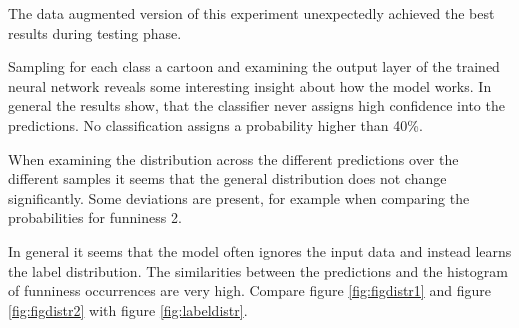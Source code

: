 \documentclass[draft,final,oneside]{vutinfth} %
\begin{document}
The data augmented version of this experiment unexpectedly achieved the best results during testing phase.

Sampling for each class a cartoon and examining the output layer of the trained neural network reveals some interesting insight about how the model works. In general the results show, that the classifier never assigns high confidence into the predictions. No classification assigns a probability higher than 40\%.

When examining the distribution across the different predictions over the different samples it seems that the general distribution does not change significantly. Some deviations are present, for example when comparing the probabilities for funniness 2.

In general it seems that the model often ignores the input data and instead learns the label distribution. The similarities between the predictions and the histogram of funniness occurrences are very high. Compare figure \ref{fig:figdistr1} and figure \ref{fig:figdistr2} with figure \ref{fig:labeldistr}.
\end{document}
